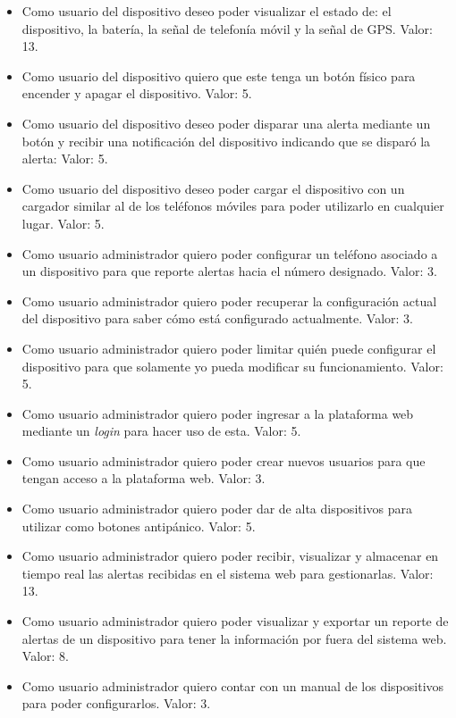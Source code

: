 \documentclass[
11pt, %
]{charter}
\begin{document}
\begin{itemize}
	\item Como usuario del dispositivo deseo poder visualizar el estado de: el dispositivo, la batería, la señal de telefonía móvil y la señal de GPS. Valor: 13.
	\item Como usuario del dispositivo quiero que este tenga un botón físico para encender y apagar el dispositivo. Valor: 5.
	\item Como usuario del dispositivo deseo poder disparar una alerta mediante un botón y recibir una notificación del dispositivo indicando que se disparó la alerta: Valor: 5.
	\item Como usuario del dispositivo deseo poder cargar el dispositivo con un cargador similar al de los teléfonos móviles para poder utilizarlo en cualquier lugar. Valor: 5.
	\item Como usuario administrador quiero poder configurar un teléfono asociado a un dispositivo para que reporte alertas hacia el número designado. Valor: 3.
	\item Como usuario administrador quiero poder recuperar la configuración actual del dispositivo para saber cómo está configurado actualmente. Valor: 3.
	\item Como usuario administrador quiero poder limitar quién puede configurar el dispositivo para que solamente yo pueda modificar su funcionamiento. Valor: 5.
	\item Como usuario administrador quiero poder ingresar a la plataforma web mediante un \textit{login} para hacer uso de esta. Valor: 5.
	\item Como usuario administrador quiero poder crear nuevos usuarios para que tengan acceso a la plataforma web. Valor: 3.
	\item Como usuario administrador quiero poder dar de alta dispositivos para utilizar como botones antipánico. Valor: 5.
	\item Como usuario administrador quiero poder recibir, visualizar y almacenar en tiempo real las alertas recibidas en el sistema web para gestionarlas. Valor: 13.
	\item Como usuario administrador quiero poder visualizar y exportar un reporte de alertas de un dispositivo para tener la información por fuera del sistema web. Valor: 8.
	\item Como usuario administrador quiero contar con un manual de los dispositivos para poder configurarlos. Valor: 3.

\end{itemize}
\end{document}
